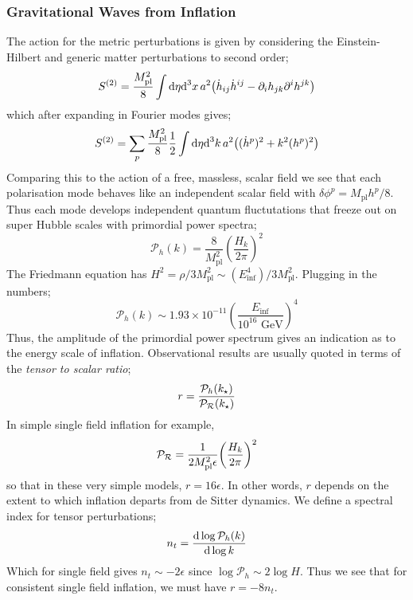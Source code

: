 \subsubsection{Gravitational Waves from Inflation}
The action for the metric perturbations is given by considering the Einstein-Hilbert and generic matter perturbations to second order;
\begin{equation}
S^{(2)} = \frac{M^2_{\text{pl}}}{8}\int{\ud \eta \upd{^3 x}a^2\left(\dot{h}_{ij}\dot{h}^{ij} - \del_i h_{jk}\del^{i}h^{jk}\right)}
\end{equation}
which after expanding in Fourier modes gives;
\begin{equation*}
S^{(2)} = \sum_{p}{\frac{M^2_{\text{pl}}}{8}\frac{1}{2}\int{\ud \eta \upd{^3 k}a^2 \left((\dot{h}^{p})^2 + k^2 (h^{p})^2\right)}}
\end{equation*}
Comparing this to the action of a free, massless, scalar field we see that each polarisation mode behaves like an independent scalar field with $\delta \phi^{p} = M_{\text{pl}}h^{p}/8$. Thus each mode develops independent quantum fluctutations that freeze out on super Hubble scales with primordial power spectra;
\begin{equation}
\mathcal{P}_h(k) = \frac{8}{M^2_{\text{pl}}}\left(\frac{H_k}{2\pi}\right)^2
\end{equation}
The Friedmann equation has $H^2 = \rho / 3M^2_{\text{pl}} \sim (E^4_{\text{inf}})/3M^2_{\text{pl}}$. Plugging in the numbers;
\begin{equation*}
\mathcal{P}_h(k) \sim 1.93 \times 10^{-11}\left(\frac{E_{\text{inf}}}{10^{16}\,\,\text{GeV}}\right)^4
\end{equation*}
Thus, the amplitude of the primordial power spectrum gives an indication as to the energy scale of inflation. Observational results are usually quoted in terms of the \emph{tensor to scalar ratio};
\begin{equation}
r = \frac{\mathcal{P}_h(k_\star)}{\mathcal{P}_{\mathcal{R}}(k_\star)}
\end{equation}
In simple single field inflation for example,
\begin{equation*}
\mathcal{P}_{\mR} = \frac{1}{2M^2_{\text{pl}}\epsilon}\left(\frac{H_k}{2\pi}\right)^2
\end{equation*}
so that in these very simple models, $r = 16\epsilon$. In other words, $r$ depends on the extent to which inflation departs from de Sitter dynamics. We define a spectral index for tensor perturbations;
\begin{equation}
n_t = \frac{\text{d} \log \mathcal{P}_h(k)}{\text{d} \log k}
\end{equation}
Which for single field gives $n_t \sim -2 \epsilon$ since $\log \mathcal{P}_h \sim 2\log H$. Thus we see that for consistent single field inflation, we must have $r = -8n_t$.
